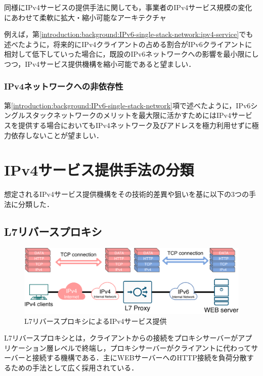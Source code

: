 同様にIPv4サービスの提供手法に関しても，事業者のIPv4サービス規模の変化にあわせて柔軟に拡大・縮小可能なアーキテクチャ

例えば，第\ref{introduction:background:IPv6-single-stack-network:ipv4-service}でも述べたように，将来的にIPv4クライアントの占める割合がIPv6クライアントに相対して低下していった場合に，既設のIPv6ネットワークへの影響を最小限にしつつ，IPv4サービス提供機構を縮小可能であると望ましい．


\subsubsection{IPv4ネットワークへの非依存性}
第\ref{introduction:background:IPv6-single-stack-network}項で述べたように，IPv6シングルスタックネットワークのメリットを最大限に活かすためにはIPv4サービスを提供する場合においてもIPv4ネットワーク及びアドレスを極力利用せずに極力依存しないことが望ましい．



\section{IPv4サービス提供手法の分類}
想定されるIPv4サービス提供機構をその技術的差異や狙いを基に以下の3つの手法に分類した．

\subsection{L7リバースプロキシ}

\begin{figure}[h]
    \begin{center}
      \includegraphics[width=15cm,pagebox=cropbox,clip]{img/L7_proxy_model.pdf}
    \end{center}
    \caption{L7リバースプロキシによるIPv4サービス提供}
    \label{fig:L7_proxy_model}
\end{figure}


L7リバースプロキシとは，クライアントからの接続をプロキシサーバーがアプリケーション層レベルで終端し，プロキシサーバーがクライアントに代わってサーバーと接続する機構である\cite{Gilly2011}．主にWEBサーバーへのHTTP接続を負荷分散するための手法として広く採用されている．

